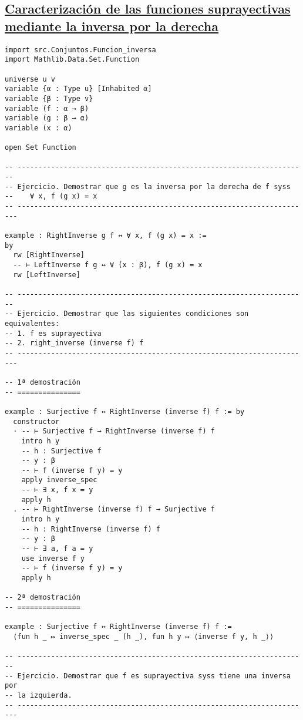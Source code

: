 \subsection{\href{./src/Conjuntos/Caracterizacion\_de\_las\_funciones\_suprayectivas\_mediante\_la\_inversa\_por\_la\_derecha.lean}{Caracterización de las funciones suprayectivas mediante la inversa por la derecha}}
\label{sec:org63fc1b1}
\begin{verbatim}
import src.Conjuntos.Funcion_inversa
import Mathlib.Data.Set.Function

universe u v
variable {α : Type u} [Inhabited α]
variable {β : Type v}
variable (f : α → β)
variable (g : β → α)
variable (x : α)

open Set Function

-- ---------------------------------------------------------------------
-- Ejercicio. Demostrar que g es la inversa por la derecha de f syss
--    ∀ x, f (g x) = x
-- ----------------------------------------------------------------------

example : RightInverse g f ↔ ∀ x, f (g x) = x :=
by
  rw [RightInverse]
  -- ⊢ LeftInverse f g ↔ ∀ (x : β), f (g x) = x
  rw [LeftInverse]

-- ---------------------------------------------------------------------
-- Ejercicio. Demostrar que las siguientes condiciones son equivalentes:
-- 1. f es suprayectiva
-- 2. right_inverse (inverse f) f
-- ----------------------------------------------------------------------

-- 1ª demostración
-- ===============

example : Surjective f ↔ RightInverse (inverse f) f := by
  constructor
  · -- ⊢ Surjective f → RightInverse (inverse f) f
    intro h y
    -- h : Surjective f
    -- y : β
    -- ⊢ f (inverse f y) = y
    apply inverse_spec
    -- ⊢ ∃ x, f x = y
    apply h
  . -- ⊢ RightInverse (inverse f) f → Surjective f
    intro h y
    -- h : RightInverse (inverse f) f
    -- y : β
    -- ⊢ ∃ a, f a = y
    use inverse f y
    -- ⊢ f (inverse f y) = y
    apply h

-- 2ª demostración
-- ===============

example : Surjective f ↔ RightInverse (inverse f) f :=
  ⟨fun h _ ↦ inverse_spec _ (h _), fun h y ↦ ⟨inverse f y, h _⟩⟩

-- ---------------------------------------------------------------------
-- Ejercicio. Demostrar que f es suprayectiva syss tiene una inversa por
-- la izquierda.
-- ----------------------------------------------------------------------


\end{verbatim}
